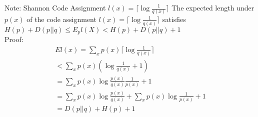 \documentclass[10pt]{article}
\begin{document}
\begin{tiny}
\begin{multicols}{3}
Note: Shannon Code Assignment $l(x) = \lceil \log \frac {1}{q(x)} \rceil$
 \label{thm:wrongcode}
The expected length under ${p(x)}$ of the code assignment ${l(x)}=\lceil\log\frac{1}{q(x)}\rceil$ satisfies 
$H(p)+D(p||q) \leq E_pl(X)<H(p)+D(p||q)+1$ \\
Proof: 
\begin{eqnarray}
El(x) = \sum_x p(x) \lceil\log \frac{1}{q(x)}\rceil \\
< \sum_x p(x) (\log \frac{1}{q(x)} + 1) \\
= \sum_x p(x) \log \frac{p(x)}{q(x)} \frac{1}{p(x)} + 1 \\
= \sum_x p(x) \log \frac{p(x)}{q(x)} + \sum_x p(x) \log \frac{1}{p(x)} + 1 \\
= D(p||q) + H(p) + 1
\end{eqnarray}





\end{multicols}
\end{tiny}
\end{document}
